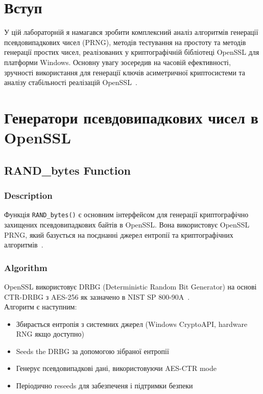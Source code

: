 \section{Вступ}

У цій лабораторній я намагався зробити комплексний аналіз алгоритмів генерації псевдовипадкових чисел (PRNG), методів
тестування на простоту та методів генерації простих чисел, реалізованих у криптографічній бібліотеці OpenSSL для платформи
Windows. Основну увагу зосередив на часовій ефективності, зручності використання для генерації ключів асиметричної криптосистеми
та аналізу стабільності реалізацій OpenSSL~\cite{openssl_manual, viega2002network}.

\section{Генератори псевдовипадкових чисел в OpenSSL}

\subsection{RAND\_bytes Function}

\subsubsection{Description}
Функція \texttt{RAND\_bytes()} є основним інтерфейсом для генерації криптографічно захищених псевдовипадкових байтів
в OpenSSL. Вона використовує OpenSSL PRNG, який базується на поєднанні джерел ентропії та криптографічних
алгоритмів~\cite{openssl_manual, barker2015recommendation}.

\subsubsection{Algorithm}
OpenSSL використовує DRBG (Deterministic Random Bit Generator) на основі CTR-DRBG з AES-256 як зазначено в
NIST SP 800-90A~\cite{barker2015recommendation}. \\
Алгоритм є наступним:
\begin{itemize}
    \item Збирається ентропія з системних джерел (Windows CryptoAPI, hardware RNG якщо доступно)
    \item Seeds the DRBG за допомогою зібраної ентропії
    \item Генерує псевдовипадкові дані, використовуючи AES-CTR mode
    \item Періодично reseeds для забезпеченя і підтримки безпеки
\end{itemize}

